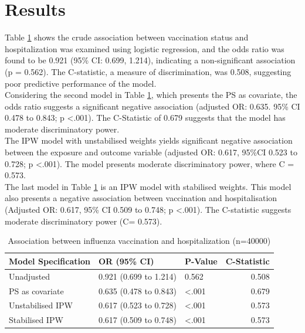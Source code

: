 \documentclass[
]{article}
\begin{document}
\hypertarget{results}{%
\section{Results}\label{results}}

Table \ref{tab:res} shows the crude association between vaccination status and hospitalization was examined using logistic regression, and the odds ratio was found to be 0.921 (95\% CI: 0.699, 1.214), indicating a non-significant association (p = 0.562). The C-statistic, a measure of discrimination, was 0.508, suggesting poor predictive performance of the model.\\
\hspace*{0.333em}\hspace*{0.333em}\hspace*{0.333em}\hspace*{0.333em}Considering the second model in Table \ref{tab:res}, which presents the PS as covariate, the odds ratio suggests a significant negative association (adjusted OR: 0.635. 95\% CI 0.478 to 0.843; p \textless.001). The C-Statistic of 0.679 suggests that the model has moderate discriminatory power.\\
\hspace*{0.333em}\hspace*{0.333em}\hspace*{0.333em}\hspace*{0.333em}The IPW model with unstabilised weights yields significant negative association between the exposure and outcome variable (adjusted OR: 0.617, 95\%CI 0.523 to 0.728; p \textless.001). The model presents moderate discriminatory power, where C = 0.573.\\
\hspace*{0.333em}\hspace*{0.333em}\hspace*{0.333em}\hspace*{0.333em}The last model in Table \ref{tab:res} is an IPW model with stabilised weights. This model also presents a negative association between vaccination and hospitalisation (Adjusted OR: 0.617, 95\% CI 0.509 to 0.748; p \textless.001). The C-statistic suggests moderate discriminatory power (C= 0.573).

\begin{table}[!h]

\caption{\label{tab:res}Association between influenza vaccination and hospitalization (n=40000)}
\centering
\begin{tabular}[t]{lllr}
\toprule
Model Specification & OR (95\% CI) & P-Value & C-Statistic\\
\midrule
Unadjusted & 0.921 (0.699 to 1.214) & 0.562 & 0.508\\
PS as covariate & 0.635 (0.478 to 0.843) & <.001 & 0.679\\
Unstabilised IPW & 0.617 (0.523 to 0.728) & <.001 & 0.573\\
Stabilised IPW & 0.617 (0.509 to 0.748) & <.001 & 0.573\\
\bottomrule
\end{tabular}
\end{table}
\end{document}
